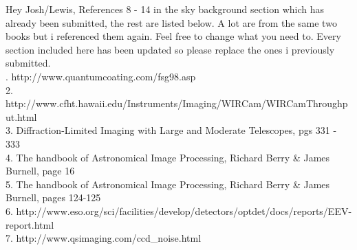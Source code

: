 \documentclass[pdf,color]{UoBnote}
\begin{document}
Hey Josh/Lewis, References 8 - 14 in the sky background section which has already been submitted, the rest are listed below. A lot are from the same two books but i referenced them again. Feel free to change what you need to. Every section included here has been updated so please replace the ones i previously submitted.\\
\newline
{}. http://www.quantumcoating.com/fsg98.asp
\\
2. http://www.cfht.hawaii.edu/Instruments/Imaging/WIRCam/WIRCamThroughput.html
\\
3. Diffraction-Limited Imaging with Large and Moderate Telescopes, pgs 331 - 333
\\
4. The handbook of Astronomical Image Processing, Richard Berry \& James Burnell, page 16
\\
5. The handbook of Astronomical Image Processing, Richard Berry \& James Burnell, pages 124-125
\\
6. http://www.eso.org/sci/facilities/develop/detectors/optdet/docs/reports/EEV-report.html
\\
7.	http://www.qsimaging.com/ccd\_noise.html
\end{document}

